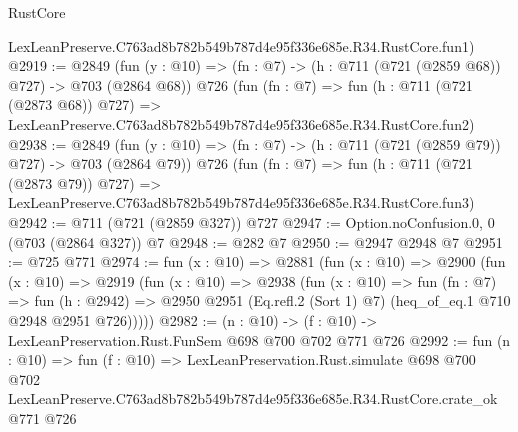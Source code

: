 \begin{lexlean}{RustCore}
\begin{coremodule}
    LexLeanPreserve.C763ad8b782b549b787d4e95f336e685e.R34.RustCore.fun1)
@2919 := @2849
    (fun (y : @10) => (fn : @7) -> (h : @711 (@721 (@2859 @68)) @727) -> @703 (@2864 @68))
    @726
    (fun (fn : @7) =>
    fun (h : @711 (@721 (@2873 @68)) @727) =>
    LexLeanPreserve.C763ad8b782b549b787d4e95f336e685e.R34.RustCore.fun2)
@2938 := @2849
    (fun (y : @10) => (fn : @7) -> (h : @711 (@721 (@2859 @79)) @727) -> @703 (@2864 @79))
    @726
    (fun (fn : @7) =>
    fun (h : @711 (@721 (@2873 @79)) @727) =>
    LexLeanPreserve.C763ad8b782b549b787d4e95f336e685e.R34.RustCore.fun3)
@2942 := @711 (@721 (@2859 @327)) @727
@2947 := Option.noConfusion.{0, 0} (@703 (@2864 @327)) @7
@2948 := @282 @7
@2950 := @2947 @2948 @7
@2951 := @725 @771
@2974 := fun (x : @10) =>
  @2881
    (fun (x : @10) =>
    @2900
      (fun (x : @10) =>
      @2919
        (fun (x : @10) =>
        @2938
          (fun (x : @10) =>
          fun (fn : @7) =>
          fun (h : @2942) =>
          @2950 @2951 (Eq.refl.{2} (Sort 1) @7) (heq_of_eq.{1} @710 @2948 @2951 @726)))))
@2982 := (n : @10) -> (f : @10) -> LexLeanPreservation.Rust.FunSem @698 @700 @702 @771 @726
@2992 := fun (n : @10) =>
  fun (f : @10) =>
  LexLeanPreservation.Rust.simulate
    @698
    @700
    @702
    LexLeanPreserve.C763ad8b782b549b787d4e95f336e685e.R34.RustCore.crate_ok
    @771
    @726
\end{coremodule}
\end{lexlean}
